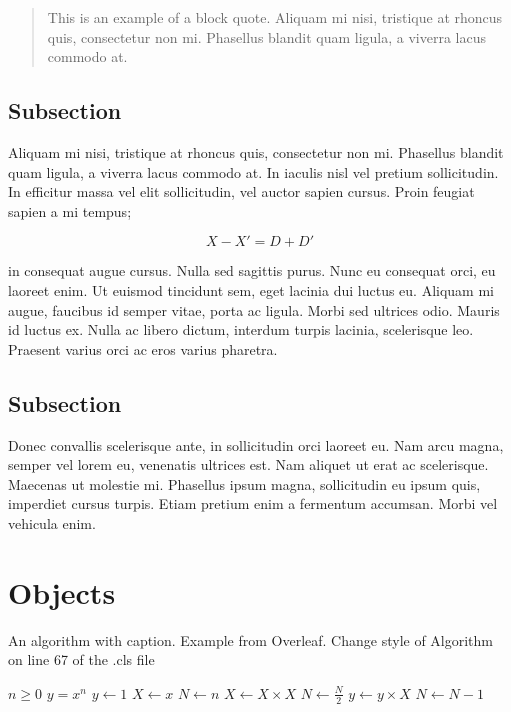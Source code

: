 \begin{quote}
    \begin{singlespace}
  This is an example of a block quote. Aliquam mi nisi, tristique at rhoncus quis, consectetur non mi. Phasellus blandit quam ligula, a viverra lacus commodo at. 
    \end{singlespace}
    
\end{quote}

\subsection{Subsection}

Aliquam mi nisi, tristique at rhoncus quis, consectetur non mi. Phasellus blandit quam ligula, a viverra lacus commodo at. In iaculis nisl vel pretium sollicitudin. In efficitur massa vel elit sollicitudin, vel auctor sapien cursus. Proin feugiat sapien a mi tempus;

\begin{equation}
    X-X'=D+D'
\end{equation}
 
 
\noindent in consequat augue cursus. Nulla sed sagittis purus. Nunc eu consequat orci, eu laoreet enim. Ut euismod tincidunt sem, eget lacinia dui luctus eu. Aliquam mi augue, faucibus id semper vitae, porta ac ligula. Morbi sed ultrices odio. Mauris id luctus ex. Nulla ac libero dictum, interdum turpis lacinia, scelerisque leo. Praesent varius orci ac eros varius pharetra.


\subsection{Subsection}
Donec convallis scelerisque ante, in sollicitudin orci laoreet eu. Nam arcu magna, semper vel lorem eu, venenatis ultrices est. Nam aliquet ut erat ac scelerisque. Maecenas ut molestie mi. Phasellus ipsum magna, sollicitudin eu ipsum quis, imperdiet cursus turpis. Etiam pretium enim a fermentum accumsan. Morbi vel vehicula enim.

\section{Objects}

\begin{algorithm}
\caption{An algorithm with caption. Example from Overleaf. Change style of Algorithm on line 67 of the .cls file}\label{alg:cap}
\begin{algorithmic}
\Require $n \geq 0$
\Ensure $y = x^n$
\State $y \gets 1$
\State $X \gets x$
\State $N \gets n$
    \State $X \gets X \times X$
    \State $N \gets \frac{N}{2}$  
    \State $y \gets y \times X$
    \State $N \gets N - 1$
\EndIf
\EndWhile
\end{algorithmic}
\end{algorithm}

